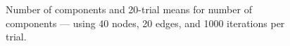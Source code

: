 \documentclass[a4paper,10pt]{article}
\begin{document}
\begin{figure}[H]
\begin{center}
\caption{Number of components and 20-trial means for number of components --- using 40 nodes, 20 edges, and 1000 iterations per trial.}
\end{center}
\end{figure} 


\end{document}
